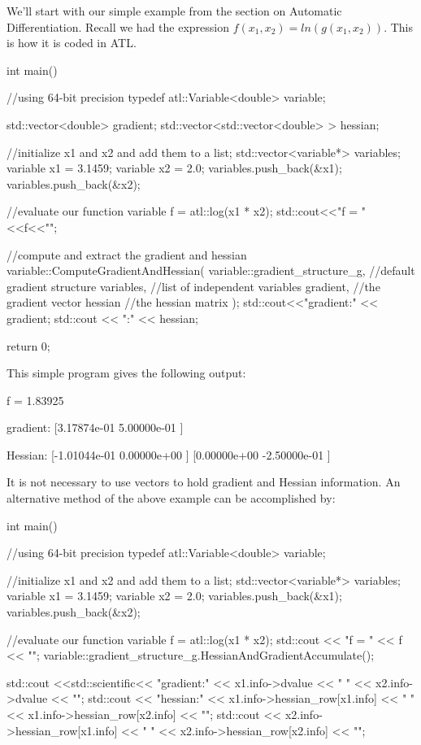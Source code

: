 \documentclass[12pt,a4paper]{article}
\begin{document}
We'll start with our simple example from the section on Automatic Differentiation. Recall we had the expression $f(x_1,x_2) = ln(g(x_1,x_2))$. This is how it is coded in ATL.
\begin{cppsource}
int main() {
    //using 64-bit precision
    typedef atl::Variable<double> variable; 
    
    
    std::vector<double> gradient;
    std::vector<std::vector<double> > hessian;

    //initialize x1 and x2 and add them to a list;
    std::vector<variable*> variables;
    variable x1 = 3.1459;
    variable x2 = 2.0;
    variables.push_back(&x1);
    variables.push_back(&x2);
    
    
    //evaluate our function
    variable f = atl::log(x1 * x2);
    std::cout<<"f = "<<f<<"\n\n";
    
    //compute and extract the gradient and hessian
    variable::ComputeGradientAndHessian(
    variable::gradient_structure_g, //default gradient structure 
     variables,                    //list of independent variables
      gradient,                    //the gradient vector
      hessian                      //the hessian matrix
      );
    std::cout<<"gradient:\n" << gradient;
    std::cout << "\n\nHessian:\n" << hessian;
    
    return 0;
}
\end{cppsource}
This simple program gives the following output:
\begin{myoutput}
f = 1.83925

gradient:
[3.17874e-01    5.00000e-01    ]

Hessian:
[-1.01044e-01   0.00000e+00    ]
[0.00000e+00    -2.50000e-01   ]
\end{myoutput}
It is not necessary to use vectors to hold gradient and Hessian information.  An alternative method of the above example can be accomplished by:
\begin{cppsource}
int main(){
   //using 64-bit precision
  typedef atl::Variable<double> variable;

    //initialize x1 and x2 and add them to a list;
    std::vector<variable*> variables;
    variable x1 = 3.1459;
    variable x2 = 2.0;
    variables.push_back(&x1);
    variables.push_back(&x2);


    //evaluate our function
    variable f = atl::log(x1 * x2);
    std::cout << "f = " << f << "\n\n";
    variable::gradient_structure_g.HessianAndGradientAccumulate();

    std::cout <<std::scientific<< "gradient:\n" << x1.info->dvalue << "   " << x2.info->dvalue << "\n";
    std::cout << "hessian:\n" << x1.info->hessian_row[x1.info] << "   " << x1.info->hessian_row[x2.info] << "\n";
    std::cout << x2.info->hessian_row[x1.info] << "   " << x2.info->hessian_row[x2.info] << "\n";
 }
\end{cppsource}
\end{document}
